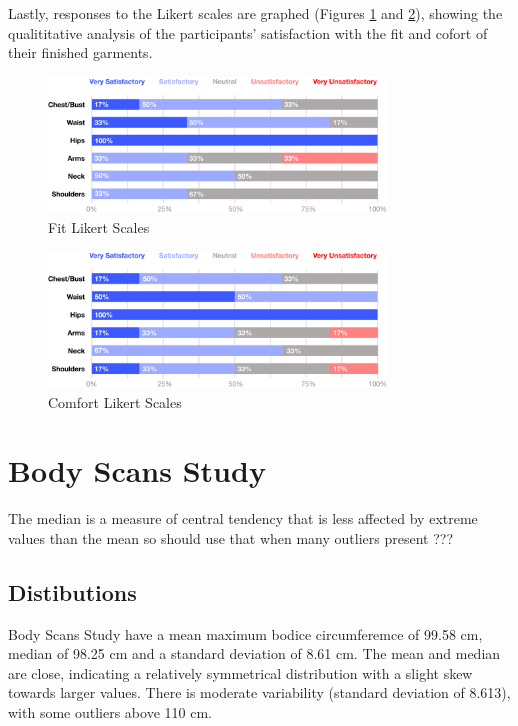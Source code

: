 Lastly, responses to the Likert scales are graphed (Figures \ref{fig:fit_likert} and \ref{fig:comfort_likert}), showing the qualititative analysis of the participants' satisfaction with the fit and cofort of their finished garments.

\begin{figure} [H]
    \centering
    \includegraphics[width = 0.8\textwidth]{Images/fit likert stacked bar.png}
    \caption{Fit Likert Scales}
    \label{fig:fit_likert}
\end{figure}
\begin{figure} [H]
    \centering
    \includegraphics[width = 0.8\textwidth]{Images/comfort likert stacked bar.png}
    \caption{Comfort Likert Scales}
    \label{fig:comfort_likert}
\end{figure}


\section{Body Scans Study}

The median is a measure of central tendency that is less affected by extreme values than the mean so should use that when many outliers present ???

\subsection{Distibutions}
Body Scans Study have a mean maximum bodice circumferemce of 99.58 cm, median of 98.25 cm and a standard deviation of 8.61 cm. The mean and median are close, indicating a relatively symmetrical distribution with a slight skew towards larger values. There is moderate variability (standard deviation of 8.613), with some outliers above 110 cm.

